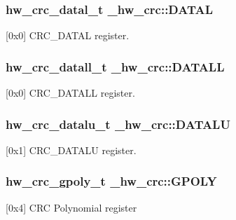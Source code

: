\subsubsection[{\texorpdfstring{D\+A\+T\+AL}{DATAL}}]{ {\bf hw\+\_\+crc\+\_\+datal\+\_\+t} \+\_\+hw\+\_\+crc\+::\+D\+A\+T\+AL}\hypertarget{struct__hw__crc_a7aec2e51aaa0bf260a302885185f1c34}{}\label{struct__hw__crc_a7aec2e51aaa0bf260a302885185f1c34}
\mbox{[}0x0\mbox{]} C\+R\+C\+\_\+\+D\+A\+T\+AL register. 
\subsubsection[{\texorpdfstring{D\+A\+T\+A\+LL}{DATALL}}]{ {\bf hw\+\_\+crc\+\_\+datall\+\_\+t} \+\_\+hw\+\_\+crc\+::\+D\+A\+T\+A\+LL}\hypertarget{struct__hw__crc_a8c19ab81392da4cd92b34cccfeccf5db}{}\label{struct__hw__crc_a8c19ab81392da4cd92b34cccfeccf5db}
\mbox{[}0x0\mbox{]} C\+R\+C\+\_\+\+D\+A\+T\+A\+LL register. 
\subsubsection[{\texorpdfstring{D\+A\+T\+A\+LU}{DATALU}}]{ {\bf hw\+\_\+crc\+\_\+datalu\+\_\+t} \+\_\+hw\+\_\+crc\+::\+D\+A\+T\+A\+LU}\hypertarget{struct__hw__crc_a85fd1a44ec8c21c91dfb2f844e3d1e9c}{}\label{struct__hw__crc_a85fd1a44ec8c21c91dfb2f844e3d1e9c}
\mbox{[}0x1\mbox{]} C\+R\+C\+\_\+\+D\+A\+T\+A\+LU register. 
\subsubsection[{\texorpdfstring{G\+P\+O\+LY}{GPOLY}}]{ {\bf hw\+\_\+crc\+\_\+gpoly\+\_\+t} \+\_\+hw\+\_\+crc\+::\+G\+P\+O\+LY}\hypertarget{struct__hw__crc_a191435e2fd4e7333898bc38706a3e853}{}\label{struct__hw__crc_a191435e2fd4e7333898bc38706a3e853}
\mbox{[}0x4\mbox{]} C\+RC Polynomial register 
